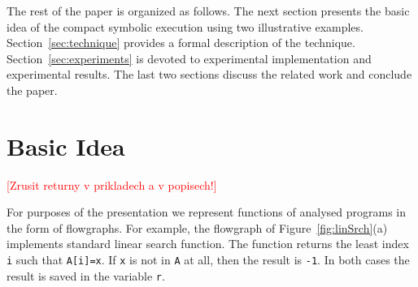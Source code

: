 \documentclass{sig-alternate}%
\newcommand{\todo}[1]{{\scriptsize{{\textcolor{red}{[#1]}}}}}
\newcommand{\var}[1]{{\tt #1}}
\begin{document}


\medskip The rest of the paper is organized as follows. The next section
presents the basic idea of the compact symbolic execution using two
illustrative examples. Section~\ref{sec:technique} provides a formal
description of the technique.
Section~\ref{sec:experiments} is devoted to experimental implementation and
experimental results. The last two sections discuss the related work and
conclude the paper.


\section{Basic Idea}\label{sec:basic}

\todo{Zrusit returny v prikladech a v popisech!}

For purposes of the presentation we represent functions of analysed
programs in the form of flowgraphs.
For example, the flowgraph of Figure~\ref{fig:linSrch}(a) implements
standard linear search function.
The function returns the least index \texttt{i} 
such that \texttt{A[i]=x}. If \texttt{x} is not in \texttt{A} at all,
then the result is \texttt{-1}. In both cases the result is saved in
the variable \var{r}.

\end{document}
